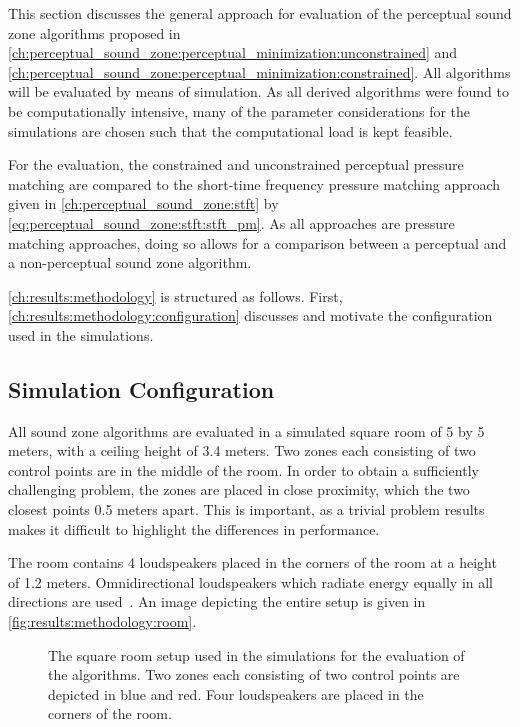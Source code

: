 This section discusses the general approach for evaluation of the perceptual sound zone algorithms proposed in 
\autoref{ch:perceptual_sound_zone:perceptual_minimization:unconstrained} and \autoref{ch:perceptual_sound_zone:perceptual_minimization:constrained}.
All algorithms will be evaluated by means of simulation. 
As all derived algorithms were found to be computationally intensive, many of the parameter considerations 
for the simulations are chosen such that the computational load is kept feasible.

For the evaluation, the constrained and unconstrained perceptual pressure matching are compared to the 
short-time frequency pressure matching approach
given in \autoref{ch:perceptual_sound_zone:stft} by \autoref{eq:perceptual_sound_zone:stft:stft_pm}.
As all approaches are pressure matching approaches, doing so allows for a comparison between a 
perceptual and a non-perceptual sound zone algorithm.

\autoref{ch:results:methodology} is structured as follows.
First, \autoref{ch:results:methodology:configuration} discusses and motivate the configuration used in the simulations.

\subsection{Simulation Configuration}
\label{ch:results:methodology:configuration}
All sound zone algorithms are evaluated in a simulated square room of 5 by 5 meters, with a ceiling height of 3.4 meters.
Two zones each consisting of two control points are in the middle of the room.
In order to obtain a sufficiently challenging problem, the zones are placed in close proximity, which the two closest points 0.5 meters apart.
This is important, as a trivial problem results makes it difficult to highlight the differences in performance.

The room contains 4 loudspeakers placed in the corners of the room at a height of 1.2 meters.
Omnidirectional loudspeakers which radiate energy equally in all directions are used~\cite{habets2006room}.
An image depicting the entire setup is given in \autoref{fig:results:methodology:room}.

\begin{figure}[]
    \centering
    \scalebox{1.0}{}
    \caption{The square room setup used in the simulations for the evaluation of the algorithms.
    Two zones each consisting of two control points are depicted in blue and red. 
    Four loudspeakers are placed in the corners of the room.}
    \label{fig:results:methodology:room}
\end{figure}

